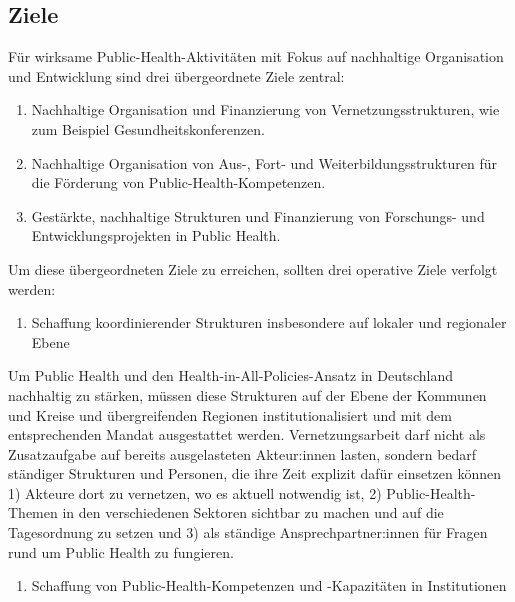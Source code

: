 \documentclass{article}
\begin{document}
\subsection{Ziele }\label{H6525104}



Für wirksame Public-Health-Aktivitäten mit Fokus auf nachhaltige Organisation und Entwicklung sind drei übergeordnete Ziele zentral:

\begin{enumerate}
\item Nachhaltige Organisation und Finanzierung von Vernetzungsstrukturen, wie zum Beispiel Gesundheitskonferenzen.


\item Nachhaltige Organisation von Aus-, Fort- und Weiterbildungsstrukturen für die Förderung von Public-Health-Kompetenzen. 


\item Gestärkte, nachhaltige Strukturen und Finanzierung von Forschungs- und Entwicklungsprojekten in Public Health.


\end{enumerate}

Um diese übergeordneten Ziele zu erreichen, sollten drei operative Ziele verfolgt werden:

\begin{enumerate}
\item Schaffung koordinierender Strukturen insbesondere auf lokaler und regionaler Ebene


\end{enumerate}

Um Public Health und den Health-in-All-Policies-Ansatz in Deutschland nachhaltig zu stärken, müssen diese Strukturen auf der Ebene der Kommunen und Kreise und übergreifenden Regionen institutionalisiert und mit dem entsprechenden Mandat ausgestattet werden. Vernetzungsarbeit darf nicht als Zusatzaufgabe auf bereits ausgelasteten Akteur:innen lasten, sondern bedarf ständiger Strukturen und Personen, die ihre Zeit explizit dafür einsetzen können 1) Akteure dort zu vernetzen, wo es aktuell notwendig ist, 2) Public-Health-Themen in den verschiedenen Sektoren sichtbar zu machen und auf die Tagesordnung zu setzen und 3) als ständige Ansprechpartner:innen für Fragen rund um Public Health zu fungieren.\textbf{ }

\begin{enumerate}[start=2]
\item Schaffung von Public-Health-Kompetenzen und -Kapazitäten in Institutionen


\end{enumerate}
\end{document}
